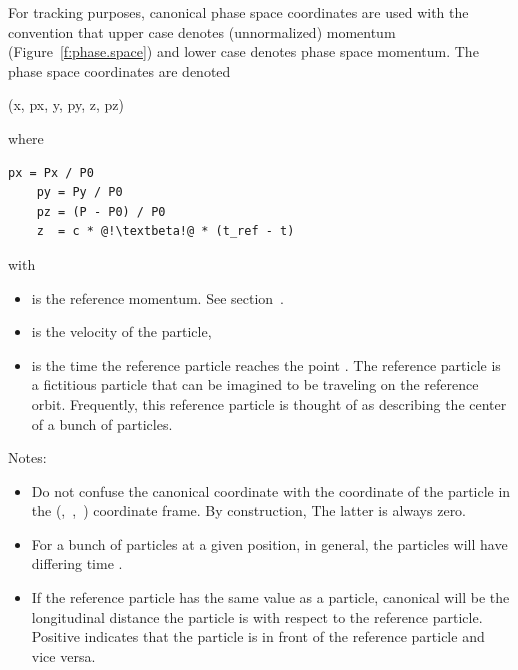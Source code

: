 \documentclass{hitec}     %
\begin{document}
For tracking purposes, canonical phase space coordinates are used with the convention that upper
case  denotes (unnormalized) momentum (Figure~\ref{f:phase.space}) and lower case 
denotes phase space momentum. The phase space coordinates are denoted
\begin{code}
    (x, px, y, py, z, pz)
\end{code}
where
\begin{lstlisting}[mathescape]
    px = Px / P0
    py = Py / P0
    pz = (P - P0) / P0
    z  = c * @!\textbeta!@ * (t_ref - t)
\end{lstlisting}
with
\vspace{-5 pt}
\begin{itemize}
\item {} is the reference momentum. See section~.
\item {} is the velocity of the particle, 
\item {} is the time the reference particle reaches the point . The reference
particle is a fictitious particle that can be imagined to be traveling on the reference orbit.
Frequently, this reference particle is thought of as describing the center of a bunch of particles.
\end{itemize}
Notes:
\vspace{-5 pt}
\begin{itemize}
\item
Do not confuse the canonical  coordinate with the  coordinate of the particle in the
(,~,~) coordinate frame. By construction, The latter is always zero.
\item 
For a bunch of particles at a given  position, in general, the particles will have differing
time .
\item 
If the reference particle has the same {\textbeta} value as a particle, canonical  will be the
longitudinal distance the particle is with respect to the reference particle. Positive 
indicates that the particle is in front of the reference particle and vice versa.
\end{itemize}
\end{document}
